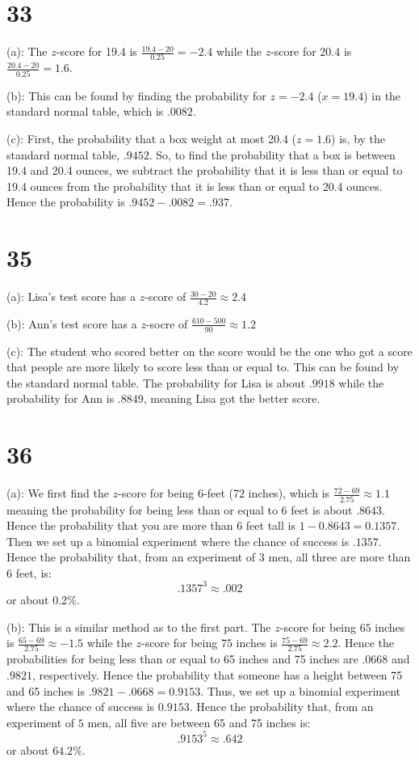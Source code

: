 \documentclass{article}
\theoremstyle{definition}
\newcommand{\?}{\stackrel{?}{=}}
\begin{document}
\section*{33}
(a): The $z$-score for 19.4 is $\frac{19.4-20}{0.25}=-2.4$ while the $z$-score for 20.4 is $\frac{20.4-20}{0.25}=1.6$.


(b): This can be found by finding the probability for $z=-2.4$ ($x=19.4$) in the standard normal table, which is $.0082$.


(c): First, the probability that a box weight at most 20.4 ($z=1.6$) is, by the standard normal table, $.9452$. So, to find the probability that a box is between 19.4 and 20.4 ounces, we subtract the probability that it is 
less than or equal to 19.4 ounces from the probability that it is less than or equal to 20.4 ounces. Hence the probability is $.9452-.0082=.937$. 

\section*{35}
(a): Lisa's test score has a $z$-score of $\frac{30-20}{4.2}\approx 2.4$


(b): Ann's test score has a $z$-socre of $\frac{610-500}{90}\approx 1.2$


(c): The student who scored better on the score would be the one who got a score that people are more likely to score less than or equal to. This can be found by the standard normal table. The probability for 
Lisa is about $.9918$ while the probability for Ann is $.8849$, meaning Lisa got the better score.

\section*{36}
(a): We first find the $z$-score for being 6-feet (72 inches), which is $\frac{72-69}{2.75}\approx 1.1$ meaning the probability for being less than or equal to 6 feet is 
about $.8643$. Hence the probability that you are more than 6 feet tall is $1-0.8643=0.1357$. 
Then we set up a binomial experiment where the chance of success is $.1357$. Hence the probability that, from an experiment of $3$ men, all three are more than 6 feet, is:
\[ .1357^3\approx .002 \] or about $0.2\%$.


(b): This is a similar method as to the first part. The $z$-score for being $65$ inches is $\frac{65-69}{2.75}\approx -1.5$ while the $z$-score for being $75$ inches is $\frac{75-69}{2.75}\approx 2.2$. Hence the 
probabilities for being less than or equal to 65 inches and 75 inches are $.0668$ and $.9821$, respectively. Hence the probability that someone has a height between 75 and 65 inches is 
$.9821-.0668=0.9153$. Thus, we set up a binomial experiment where the chance of success is $0.9153$. Hence the probability that, from an experiment of $5$ men, all five are between 65 and 75 inches is:
\[ .9153^5\approx .642 \] or about $64.2\%$. 
\end{document}
